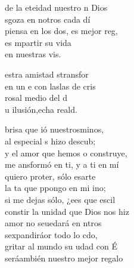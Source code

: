 \begin{cancion}%
	de la eteidad nuestro n Dios\\
	sgoza en notros cada dí\\
	piensa en los dos, es  mejor reg,\\
	es mpartir su vida \\
	en nuestras vis.\jump\\
	\begin{chorus}%
		estra amistad stransfor  \\
		en un e con laslas de cris  \\
		 rosal  medio del d \\
		u ilusión,echa reald.\jump\\
	\end{chorus}%
	brisa que ió nuestrosminos,\\
	al especial s hizo descub;\\
	y el amor que hemos o construye,\\
	me ansformó en ti, y a ti en mí\\
	\jump
	quiero proter, sólo esarte\\
	la ta que ppongo en mi ino;\\
	si me dejas sólo, ¿ees que escil\\
	constir la unidad que Dios nos hiz \\
	\jump
	amor no seuedará en ntros\\
	sexpandiráor todo lo cdo,\\
	gritar al mundo su udad con É \\
	seráambién nuestro mejor regalo\\
	\jump
\end{cancion}%
